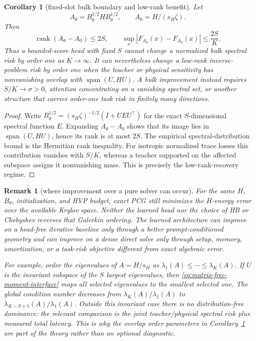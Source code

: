 \documentclass[11pt]{article}
\newtheorem{corollary}{Corollary}
\newtheorem{remark}{Remark}
\begin{document}
\begin{corollary}[fixed-slot bulk boundary and low-rank benefit]
\label{cor:fixed-slot-boundary}
Let
\[
 A_\theta=B_\theta^{1/2}HB_\theta^{1/2},
 \qquad A_0=H/(s_H\zeta) .
\]
Then
\[
 \operatorname{rank}(A_\theta-A_0)\leq 2S,
 \qquad
 \sup_x\left|F_{A_\theta}(x)-F_{A_0}(x)\right|\leq\frac{2S}{K}.
\]
Thus a bounded-score head with fixed \(S\) cannot change a normalized bulk
spectral risk by order one as \(K\to\infty\).  It can nevertheless change a
low-rank inverse-problem risk by order one when the teacher or physical
sensitivity has nonvanishing overlap with \(\operatorname{span}(U,HU)\).
A bulk improvement instead requires \(S/K\to\sigma>0\), attention
concentrating on a vanishing spectral set, or another structure that carries
order-one task risk in finitely many directions.
\end{corollary}
\begin{proof}
Write
\(B_\theta^{1/2}=(s_H\zeta)^{-1/2}(I+UEU^\top)\) for the exact
\(S\)-dimensional spectral function \(E\).  Expanding \(A_\theta-A_0\) shows that its image lies
in \(\operatorname{span}(U,HU)\), hence its rank is at most \(2S\).  The
empirical spectral-distribution bound is the Hermitian rank inequality.  For
isotropic normalized trace losses this contribution vanishes with \(S/K\),
whereas a teacher supported on the affected subspace assigns it nonvanishing
mass.  This is precisely the low-rank-recovery regime.
\end{proof}

\begin{remark}[where improvement over a pure solver can occur]
\label{rem:pure-solver-boundary}
For the same \(H\), \(B_\theta\), initialization, and HVP budget, exact PCG
still minimizes the \(H\)-energy error over the available Krylov space.
Neither the learned head nor the choice of HB or Chebyshev reverses that
Galerkin ordering.  The learned architecture can improve on a
\emph{head-free} iterative baseline only through a better prompt-conditioned
geometry and can improve on a dense direct solve only through setup, memory,
amortization, or a task-risk objective different from exact algebraic error.

For example, order the eigenvalues of \(A=H/s_H\) as
\(\lambda_1(A)\leq\cdots\leq\lambda_K(A)\).  If \(U\) is the invariant
subspace of the \(S\) largest eigenvalues, then
\eqref{eq:matrix-free-moment-interface} maps all selected eigenvalues to the
smallest selected one.  The global condition number decreases from
\(\lambda_K(A)/\lambda_1(A)\) to
\(\lambda_{K-S+1}(A)/\lambda_1(A)\).  Outside this invariant case there is no
distribution-free dominance: the relevant comparison is the joint
teacher/physical spectral risk plus measured total latency.  This is why the
overlap order parameters in Corollary~\ref{cor:fixed-slot-boundary} are part
of the theory rather than an optional diagnostic.
\end{remark}
\end{document}
